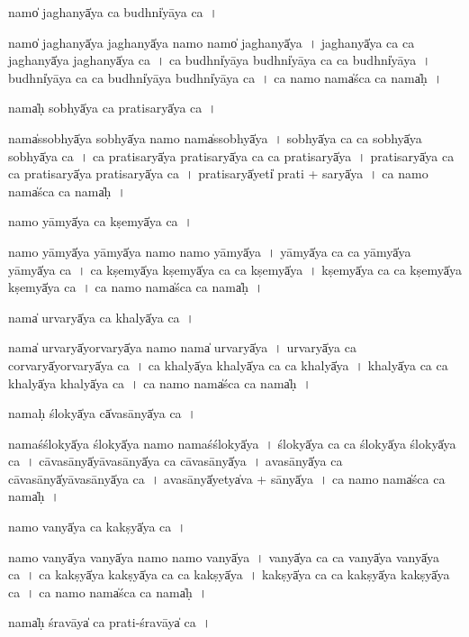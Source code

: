 \documentclass[parskip, DIV=14]{scrartcl}
\begin{document}
{namo̍ jagha॒nyā̍ya ca॒ budhni̍yāya ca॒~।

namo̍ jagha॒nyā̍ya jagha॒nyā̍ya॒ namo॒ namo̍ jagha॒nyā̍ya~।
ja॒gha॒nyā̍ya ca ca jagha॒nyā̍ya jagha॒nyā̍ya ca~।
ca॒ budhni̍yāya॒ budhni̍yāya ca ca॒ budhni̍yāya~।
budhni̍yāya ca ca॒ budhni̍yāya॒ budhni̍yāya ca~।
ca॒ namo॒ nama̍śca ca॒ nama̍ḥ~।

nama̍ḥ so॒bhyā̍ya ca pratisa॒ryā̍ya ca॒~।

nama̍sso॒bhyā̍ya so॒bhyā̍ya॒ namo॒ nama̍sso॒bhyā̍ya~।
so॒bhyā̍ya ca ca so॒bhyā̍ya so॒bhyā̍ya ca~।                                                                                                                                  
ca॒ pra॒ti॒sa॒ryā̍ya pratisa॒ryā̍ya ca ca pratisa॒ryā̍ya~।
pra॒ti॒sa॒ryā̍ya ca ca pratisa॒ryā̍ya pratisa॒ryā̍ya ca~।
pra॒ti॒sa॒ryā̍yeti̍ prati + sa॒ryā̍ya~।
ca॒ namo॒ nama̍śca ca॒ nama̍ḥ~।

namo॒ yāmyā̍ya ca॒ kṣemyā̍ya ca॒~।

namo॒ yāmyā̍ya॒ yāmyā̍ya॒ namo॒ namo॒ yāmyā̍ya~।
yāmyā̍ya ca ca॒ yāmyā̍ya॒ yāmyā̍ya ca~।
ca॒ kṣemyā̍ya॒ kṣemyā̍ya ca ca॒ kṣemyā̍ya~।
kṣemyā̍ya ca ca॒ kṣemyā̍ya॒ kṣemyā̍ya ca~।
ca॒ namo॒ nama̍śca ca॒ nama̍ḥ~।
                                                                                                                                                               
nama̍ urva॒ryā̍ya ca॒ khalyā̍ya ca॒~।

nama̍ urva॒ryā̍yorva॒ryā̍ya॒ namo॒ nama̍ urva॒ryā̍ya~।
u॒rva॒ryā̍ya ca corva॒ryā̍yorva॒ryā̍ya ca~।
ca॒ khalyā̍ya॒ khalyā̍ya ca ca॒ khalyā̍ya~।
khalyā̍ya ca ca॒ khalyā̍ya॒ khalyā̍ya ca~।
ca॒ namo॒ nama̍śca ca॒ nama̍ḥ~।

nama॒ḥ ślokyā̍ya cā̍vasā॒nyā̍ya ca॒~।

nama॒śślokyā̍ya॒ ślokyā̍ya॒ namo॒ nama॒śślokyā̍ya~।
ślokyā̍ya ca ca॒ ślokyā̍ya॒ ślokyā̍ya ca~।
cā॒va॒sā॒nyā̍yāvasā॒nyā̍ya ca  cāvasā॒nyā̍ya~।
a॒va॒sā॒nyā̍ya ca cāvasā॒nyā̍yāvasā॒nyā̍ya ca~।
a॒va॒sā॒nyā̍yetya̍va + sā॒nyā̍ya~।
ca॒ namo॒ nama̍śca ca॒ nama̍ḥ~।

namo॒ vanyā̍ya ca॒ kakṣyā̍ya ca॒~।

namo॒ vanyā̍ya॒ vanyā̍ya॒  namo॒ namo॒ vanyā̍ya~।
vanyā̍ya ca ca॒ vanyā̍ya॒ vanyā̍ya ca~।
ca॒ kakṣyā̍ya॒ kakṣyā̍ya ca ca॒ kakṣyā̍ya~।
kakṣyā̍ya ca ca॒ kakṣyā̍ya॒ kakṣyā̍ya ca~।
ca॒ namo॒ nama̍śca ca॒ nama̍ḥ~।

nama̍ḥ śra॒vāya̍ ca prati-śra॒vāya̍ ca॒~।

}
\end{document}
